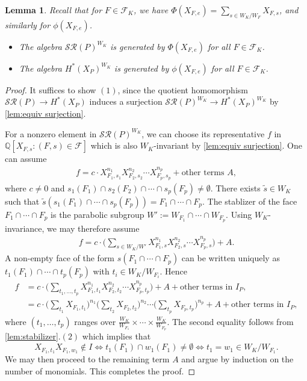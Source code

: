 \documentclass{amsart}
\theoremstyle{plain} \numberwithin{equation}{section}
\newtheorem{lemma}[theorem]{Lemma}
\theoremstyle{definition}
\newcommand{\Q}{\mathbb{Q}}
\begin{document}
\begin{lemma}\label{lem:image}
  Recall that for $F\in\mathcal{F}_K$, we have
  $\Phi(X_{F,e})=\sum_{s\in W_K/W_F} X_{F,s}$,
  and similarly for $\phi(X_{F,e})$.
  \begin{itemize}
    \item[$(1)$] The algebra $\mathcal{SR}(P)^{W_K}$ is generated by $\Phi(X_{F,e})$ for all $F\in\mathcal{F}_K$.
    \item[$(2)$] The algebra $H^*(X_{P})^{W_K}$ is generated by $\phi(X_{F,e})$ for all $F\in\mathcal{F}_K$.
  \end{itemize}
\end{lemma}
\begin{proof}
  It suffices to show $(1)$, since the  quotient homomorphism $\mathcal{SR}(P)\to H^*(X_{P})$ induces a surjection $\mathcal{SR}(P)^{W_K}\to H^*(X_{P})^{W_K}$ by \cref{lem:equiv surjection}.

For a nonzero element in $\mathcal{SR}(P)^{W_K}$, we can choose its representative $f$ in 
$\Q[X_{F,s}: (F,s)\in\mathcal{F}]$ which is also $W_K$-invariant by \cref{lem:equiv surjection}. 
One can assume 
\begin{align*} 
  f= c\cdot X_{F_1,s_1}^{n_1}X_{F_2,s_2}^{n_2}\cdots X_{F_p,s_p}^{n_p}+\text{other terms $A$}, 
\end{align*} 
where $c\neq 0$ and $s_1(F_{1})\cap s_2(F_{2})\cap\cdots \cap s_p(F_{p})\ne \emptyset$. 
There exists  $\tilde{s}\in W_K$ such that 
$\tilde{s}\left(s_1(F_{1})\cap\cdots \cap s_p(F_{p})\right)=F_{1}\cap\cdots\cap F_{p}$. 
The stablizer of the face $F_{1}\cap\cdots\cap F_{p}$ is the parabolic subgroup $W':=W_{F_1}\cap\cdots\cap W_{F_p}$.
Using $W_K$-invariance, we may therefore assume 
\begin{align*} 
  f= c\cdot\biggl(\sum_{s\in {W_K}/{W'}} X_{F_1,s}^{n_1}X_{F_2,s}^{n_2}\cdots X_{F_p,s}^{n_p}\biggr)+A. 
\end{align*}
A non-empty face of the form $s(F_1\cap \cdots \cap F_p)$ can be written uniquely as
$t_1(F_{1})\cap\cdots \cap t_p(F_{p})$ with $t_i\in W_K/W_{F_i}$.
Hence
\begin{align*} 
  f&= c\cdot\biggl(\sum_{t_1,\ldots,t_{p}} X_{F_1,t_1}^{n_1}X_{F_2,t_2}^{n_2}\cdots X_{F_p,t_p}^{n_p}\biggr)+A+\mbox{other terms in $I_P$},\\ &=c\cdot\biggl(\sum_{t_1} X_{F_1,t_1}\biggr)^{n_1}\biggl(\sum_{t_2} X_{F_2,t_2}\biggr)^{n_2}\cdots \biggl(\sum_{t_p} X_{F_p,t_p}\biggr)^{n_p}+A+\mbox{other terms in $I_P$}, 
\end{align*} 
where $(t_1,\ldots,t_p)$ ranges over $\frac{W_K}{W_{F_1}}\times\cdots\times\frac{W_K}{W_{F_p}}$.
 The second equality follows from \cref{lem:stabilizer}.$(2)$ which implies that 
 $$X_{F_1,t_1}X_{F_1,w_1}\notin I\Leftrightarrow t_1(F_{1})\cap w_1(F_{1})\ne\emptyset\Leftrightarrow t_1=w_1\in {W_K}/{W_{F_1}}.$$ 
We may then proceed to the remaining term $A$ and argue by induction on the number of monomials.
This completes the proof.
\end{proof}
\end{document}
